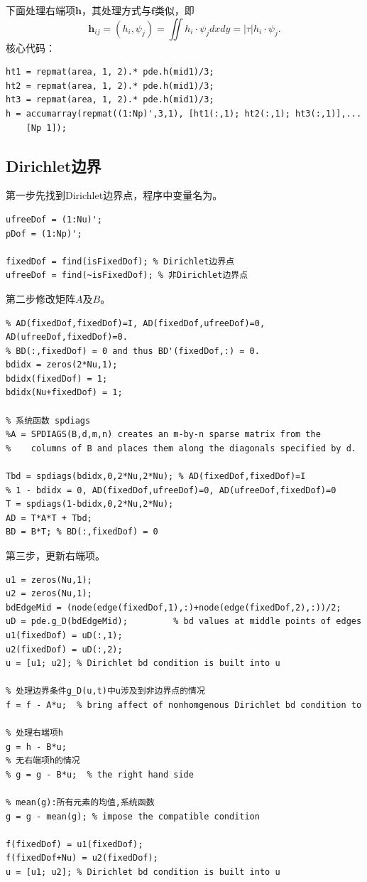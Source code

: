 \documentclass{ctexart}
\begin{document}
下面处理右端项$\mathbf{h}$，其处理方式与$\mathbf{f}$类似，即
$$
\mathbf{h}_{ij}=(h_i,\psi_j)=\iint h_i \cdot \psi_j dxdy
    =|\tau|h_i \cdot \psi_j.
$$
核心代码：
\begin{lstlisting}
ht1 = repmat(area, 1, 2).* pde.h(mid1)/3;
ht2 = repmat(area, 1, 2).* pde.h(mid1)/3;
ht3 = repmat(area, 1, 2).* pde.h(mid1)/3;
h = accumarray(repmat((1:Np)',3,1), [ht1(:,1); ht2(:,1); ht3(:,1)],...
    [Np 1]);
\end{lstlisting}



\subsection{Dirichlet边界}
第一步先找到Dirichlet边界点，程序中变量名为。
\begin{lstlisting}
ufreeDof = (1:Nu)';
pDof = (1:Np)';

fixedDof = find(isFixedDof); % Dirichlet边界点
ufreeDof = find(~isFixedDof); % 非Dirichlet边界点
\end{lstlisting}

第二步修改矩阵$A$及$B$。
\begin{lstlisting}
% AD(fixedDof,fixedDof)=I, AD(fixedDof,ufreeDof)=0, AD(ufreeDof,fixedDof)=0.
% BD(:,fixedDof) = 0 and thus BD'(fixedDof,:) = 0.
bdidx = zeros(2*Nu,1);
bdidx(fixedDof) = 1;
bdidx(Nu+fixedDof) = 1;

% 系统函数 spdiags
%A = SPDIAGS(B,d,m,n) creates an m-by-n sparse matrix from the
%    columns of B and places them along the diagonals specified by d.

Tbd = spdiags(bdidx,0,2*Nu,2*Nu); % AD(fixedDof,fixedDof)=I
% 1 - bdidx = 0, AD(fixedDof,ufreeDof)=0, AD(ufreeDof,fixedDof)=0
T = spdiags(1-bdidx,0,2*Nu,2*Nu); 
AD = T*A*T + Tbd;
BD = B*T; % BD(:,fixedDof) = 0
\end{lstlisting}

第三步，更新右端项。
\begin{lstlisting}
u1 = zeros(Nu,1);
u2 = zeros(Nu,1);
bdEdgeMid = (node(edge(fixedDof,1),:)+node(edge(fixedDof,2),:))/2;
uD = pde.g_D(bdEdgeMid);         % bd values at middle points of edges
u1(fixedDof) = uD(:,1);
u2(fixedDof) = uD(:,2);
u = [u1; u2]; % Dirichlet bd condition is built into u

% 处理边界条件g_D(u,t)中u涉及到非边界点的情况
f = f - A*u;  % bring affect of nonhomgenous Dirichlet bd condition to

% 处理右端项h
g = h - B*u;
% 无右端项h的情况
% g = g - B*u;  % the right hand side

% mean(g):所有元素的均值,系统函数
g = g - mean(g); % impose the compatible condition

f(fixedDof) = u1(fixedDof);
f(fixedDof+Nu) = u2(fixedDof);
u = [u1; u2]; % Dirichlet bd condition is built into u
\end{lstlisting}
\end{document}
